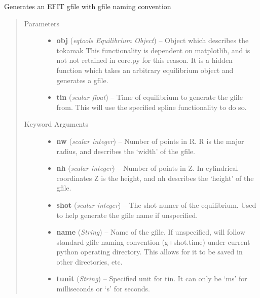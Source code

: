 \documentclass[letterpaper,10pt,english]{sphinxmanual}
\begin{document}
\begin{fulllineitems}
\label{eqtools:eqtools.filewriter.gfile}
Generates an EFIT gfile with gfile naming convention
\begin{quote}\begin{description}
\item[{Parameters}] \leavevmode\begin{itemize}
\item {} 
\textbf{obj} (\emph{eqtools Equilibrium Object}) --
Object which describes the tokamak
This functionality is dependent on matplotlib, and is not
not retained in core.py for this reason. It is a hidden
function which takes an arbitrary equilibrium object and
generates a gfile.

\item {} 
\textbf{tin} (\emph{scalar float}) --
Time of equilibrium to
generate the gfile from. This will use the specified
spline functionality to do so.

\end{itemize}

\item[{Keyword Arguments}] \leavevmode\begin{itemize}
\item {} 
\textbf{nw} (\emph{scalar integer}) --
Number of points in R.
R is the major radius, and describes the `width' of the
gfile.

\item {} 
\textbf{nh} (\emph{scalar integer}) --
Number of points in Z. In cylindrical
coordinates Z is the height, and nh describes the `height'
of the gfile.

\item {} 
\textbf{shot} (\emph{scalar integer}) --
The shot numer of the equilibrium.
Used to help generate the gfile name if unspecified.

\item {} 
\textbf{name} (\emph{String}) --
Name of the gfile.  If unspecified, will follow
standard gfile naming convention (g+shot.time) under current
python operating directory.  This allows for it to be saved
in other directories, etc.

\item {} 
\textbf{tunit} (\emph{String}) --
Specified unit for tin. It can only be `ms' for
milliseconds or `s' for seconds.


\end{itemize}
\end{description}
\end{quote}
\end{fulllineitems}
\end{document}
